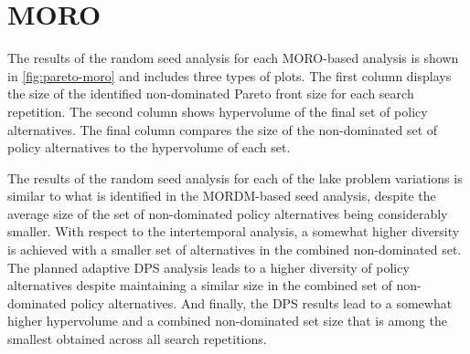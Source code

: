 \section{MORO}
The results of the random seed analysis for each MORO-based analysis is shown in \cref{fig:pareto-moro} and  includes three types of plots. The first column displays the size of the identified non-dominated Pareto front size for each search repetition. The second column shows hypervolume of the final set of policy alternatives. The final column compares the size of the non-dominated set of policy alternatives to the hypervolume of each set. 

The results of the random seed analysis for each of the lake problem variations is similar to what is identified in the MORDM-based seed analysis, despite the average size of the set of non-dominated policy alternatives being considerably smaller. With respect to the intertemporal analysis, a somewhat higher diversity is achieved with a smaller set of alternatives in the combined non-dominated set. The planned adaptive DPS analysis leads to a higher diversity of policy alternatives despite maintaining a similar size in the combined set of non-dominated policy alternatives. And finally, the DPS results lead to a somewhat higher hypervolume and a combined non-dominated set size that is among the smallest obtained across all search repetitions. 
